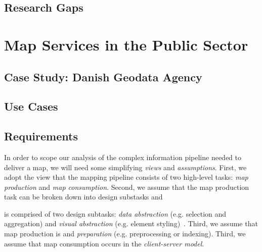 \documentclass[11pt, oneside]{report}   	%
\begin{document}
\subsection{Research Gaps}

% 


\section{Map Services in the Public Sector}

\subsection{Case Study: Danish Geodata Agency}

\subsection{Use Cases}

\subsection{Requirements}






In order to scope our analysis of the complex information pipeline needed to deliver a map, we will need some simplifying \emph{views} and \emph{assumptions}. First, we adopt the view that the mapping pipeline consists of two high-level tasks: \emph{map production} and \emph{map consumption}. Second, we assume that the map production task can be broken down into design substasks  and 

is comprised of two design subtasks: \emph{data abstraction} (e.g. selection and aggregation) and \emph{visual abstraction} (e.g. element styling)~\cite{stolte2003multiscale,jacques1967semiologie}. Third, we assume that map production is  and \emph{preparation} (e.g. preprocessing or indexing). Third, we assume that map consumption occurs in the \emph{client-server model}.
\end{document}

